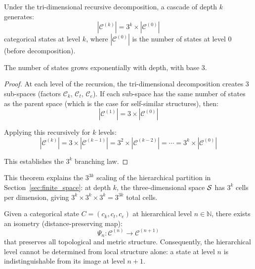 \begin{theorem}[$3^k$ Branching]
\label{thm:3k_branching_formal}
Under the tri-dimensional recursive decomposition, a cascade of depth $k$ generates:
\begin{equation}
|\mathcal{C}^{(k)}| = 3^k \times |\mathcal{C}^{(0)}|
\label{eq:3k_branching}
\end{equation}
categorical states at level $k$, where $|\mathcal{C}^{(0)}|$ is the number of states at level 0 (before decomposition).

The number of states grows exponentially with depth, with base 3.
\end{theorem}

\begin{proof}
At each level of the recursion, the tri-dimensional decomposition creates 3 sub-spaces (factors $\mathcal{C}_k$, $\mathcal{C}_t$, $\mathcal{C}_e$). If each sub-space has the same number of states as the parent space (which is the case for self-similar structures), then:
\begin{equation}
|\mathcal{C}^{(1)}| = 3 \times |\mathcal{C}^{(0)}|
\end{equation}

Applying this recursively for $k$ levels:
\begin{equation}
|\mathcal{C}^{(k)}| = 3 \times |\mathcal{C}^{(k-1)}| = 3^2 \times |\mathcal{C}^{(k-2)}| = \cdots = 3^k \times |\mathcal{C}^{(0)}|
\end{equation}

This establishes the $3^k$ branching law.
\end{proof}

This theorem explains the $3^{3k}$ scaling of the hierarchical partition in Section~\ref{sec:finite_space}: at depth $k$, the three-dimensional space $\mathcal{S}$ has $3^k$ cells per dimension, giving $3^k \times 3^k \times 3^k = 3^{3k}$ total cells.

\begin{theorem}
\label{thm:scale_ambiguity_formal}
Given a categorical state $C = (c_k, c_t, c_e)$ at hierarchical level $n \in \mathbb{N}$, there exists an isometry (distance-preserving map):
\begin{equation}
\Psi_n: \mathcal{C}^{(n)} \to \mathcal{C}^{(n+1)}
\label{eq:isometry}
\end{equation}
that preserves all topological and metric structure. Consequently, the hierarchical level cannot be determined from local structure alone: a state at level $n$ is indistinguishable from its image at level $n+1$.
\end{theorem}


